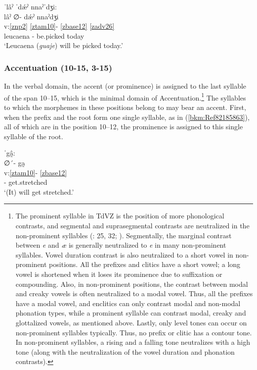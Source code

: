 \documentclass[output=paper]{langscibook}
\begin{document}
\ea\label{ex:key:zap:51}
{ˈlâˀ ˈdǽˀ nnaˀˈdʒi:}\\
\glll lâˀ ∅- dǽˀ nnaˀdʒi\\
v:\ref{znp2} \ref{ztam10}- \ref{zbase12} \ref{zadv26} \\
leucaena \Pot{}- be.picked today\\
\glt `Leucaena (\textit{guaje}) will be picked today.'
\z

\subsubsection{Accentuation (10-15, 3-15)}

In the verbal domain, the accent (or prominence) is assigned to the last syllable of the span 10--15, which is the minimal domain of Accentuation.\footnote{The prominent syllable in TdVZ is the position of more phonological contrasts, and segmental and suprasegmental contrasts are neutralized in the non-prominent syllables (\citealt{Smith-Stark2003}: 25, 32;  \citealt{Chavez-Peon2015}). Segmentally, the marginal contrast between \textit{e} and \textit{æ} is generally neutralized to \textit{e} in many non-prominent syllables. Vowel duration contrast is also neutralized to a short vowel in non-prominent positions. All the prefixes and clitics have a short vowel; a long vowel is shortened when it loses its prominence due to suffixation or compounding. Also, in non-prominent positions, the contrast between modal and creaky vowels is often neutralized to a modal vowel. Thus, all the prefixes have a modal vowel, and enclitics can only contrast modal and non-modal phonation types, while a prominent syllable can contrast modal, creaky and glottalized vowels, as mentioned above. Lastly, only level tones can occur on non-prominent syllables typically. Thus, no prefix or clitic has a contour tone. In non-prominent syllables, a rising and a falling tone neutralizes with a high tone (along with the neutralization of the vowel duration and phonation contrasts).} The syllables to which the morphemes in these positions belong to may bear an accent. First, when the prefix and the root form one single syllable, as in (\ref{bkm:Ref82185863}), all of which are in the position 10--12, the prominence is assigned to this single syllable of the root.

\ea\label{bkm:Ref82185863}
{ˈgâ̰:}\\
\glll ∅´- ga̰\\
v:\ref{ztam10}- \ref{zbase12} \\
\Pot{}- get.stretched\\
\glt `(It) will get stretched.'
\z
\end{document}
